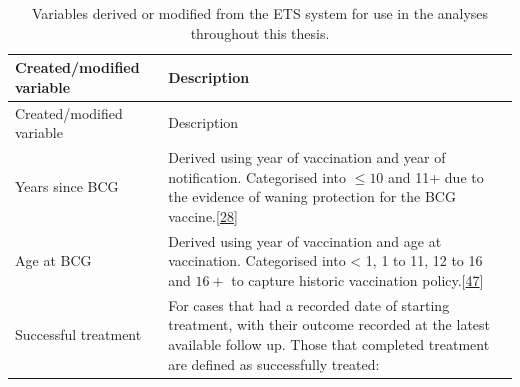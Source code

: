 \documentclass[11pt,twoside]{bristolthesis}
\begin{document}
  \newpage
  \begin{longtable}[]{@{}ll@{}}
  \caption{\label{tab:created-var} Variables derived or modified from the ETS system for use in the analyses throughout this thesis.}\tabularnewline
  \toprule
  \begin{minipage}[b]{0.33\columnwidth}\raggedright
  Created/modified variable\strut
  \end{minipage} & \begin{minipage}[b]{0.62\columnwidth}\raggedright
  Description\strut
  \end{minipage}\tabularnewline
  \midrule
  \endfirsthead
  \toprule
  \begin{minipage}[b]{0.33\columnwidth}\raggedright
  Created/modified variable\strut
  \end{minipage} & \begin{minipage}[b]{0.62\columnwidth}\raggedright
  Description\strut
  \end{minipage}\tabularnewline
  \midrule
  \endhead
  \begin{minipage}[t]{0.33\columnwidth}\raggedright
  Years since BCG\strut
  \end{minipage} & \begin{minipage}[t]{0.62\columnwidth}\raggedright
  Derived using year of vaccination and year of
  notification. Categorised into \(\leq 10\) and 11+
  due to the evidence of waning protection for the
  BCG vaccine.{[}\protect\hyperlink{ref-Abubakar2013}{28}{]}\strut
  \end{minipage}\tabularnewline
  \begin{minipage}[t]{0.33\columnwidth}\raggedright
  Age at BCG\strut
  \end{minipage} & \begin{minipage}[t]{0.62\columnwidth}\raggedright
  Derived using year of vaccination and age at
  vaccination. Categorised into \textless{} 1, 1 to 11, 12 to
  16 and \(16+\) to capture historic vaccination
  policy.{[}\protect\hyperlink{ref-PublicHealthEngland2011a}{47}{]}\strut
  \end{minipage}\tabularnewline
  \begin{minipage}[t]{0.33\columnwidth}\raggedright
  Successful treatment\strut
  \end{minipage} & \begin{minipage}[t]{0.62\columnwidth}\raggedright
  For cases that had a recorded date of starting
  treatment, with their outcome recorded at the
  latest available follow up. Those that completed
  treatment are defined as successfully treated:

\end{minipage}
\end{longtable}
\end{document}

